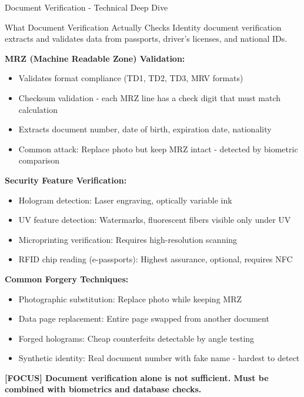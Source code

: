\documentclass[11pt,a4paper]{beamer}
\newcommand{\examfocus}[1]{\textcolor{orange!80!black}{\textbf{[FOCUS] #1}}}
\begin{document}
	\begin{frame}{Document Verification - Technical Deep Dive}
		\begin{block}{What Document Verification Actually Checks}
			Identity document verification extracts and validates data from passports, driver's licenses, and national IDs.
		\end{block}
		
		\textbf{MRZ (Machine Readable Zone) Validation:}
		\begin{itemize}
			\item Validates format compliance (TD1, TD2, TD3, MRV formats)
			\item Checksum validation - each MRZ line has a check digit that must match calculation
			\item Extracts document number, date of birth, expiration date, nationality
			\item Common attack: Replace photo but keep MRZ intact - detected by biometric comparison
		\end{itemize}
		
		\textbf{Security Feature Verification:}
		\begin{itemize}
			\item Hologram detection: Laser engraving, optically variable ink
			\item UV feature detection: Watermarks, fluorescent fibers visible only under UV
			\item Microprinting verification: Requires high-resolution scanning
			\item RFID chip reading (e-passports): Highest assurance, optional, requires NFC
		\end{itemize}
		
		\textbf{Common Forgery Techniques:}
		\begin{itemize}
			\item Photographic substitution: Replace photo while keeping MRZ
			\item Data page replacement: Entire page swapped from another document
			\item Forged holograms: Cheap counterfeits detectable by angle testing
			\item Synthetic identity: Real document number with fake name - hardest to detect
		\end{itemize}
		
		\examfocus{Document verification alone is not sufficient. Must be combined with biometrics and database checks.}
	\end{frame}
	
\end{document}

